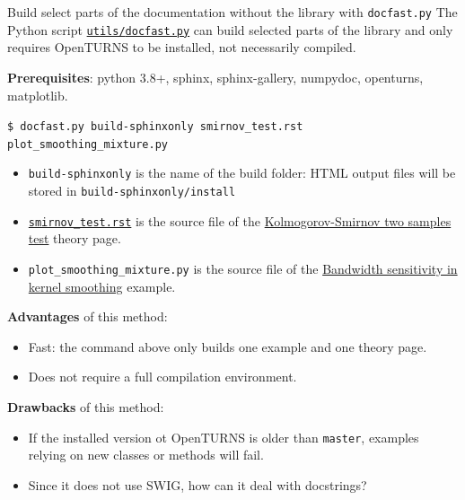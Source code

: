 \documentclass[8pt, handout]{beamer}
\begin{document}
\begin{frame}{Build select parts of the documentation without the library with \texttt{docfast.py}}
The Python script \href{https://github.com/openturns/openturns/blob/master/utils/docfast.py}{\texttt{utils/\alert{docfast.py}}} can build selected parts of the library and only requires OpenTURNS to be installed, not necessarily compiled.

\textbf{Prerequisites}: python 3.8+, sphinx, sphinx-gallery, numpydoc, openturns, matplotlib.

\texttt{\$ docfast.py build-sphinxonly smirnov\_test.rst plot\_smoothing\_mixture.py}

\begin{itemize}
    \item \texttt{build-sphinxonly} is the name of the \alert{build folder}: HTML output files will be stored in \texttt{build-sphinxonly/install}
    \item \href{https://github.com/openturns/openturns/blob/master/python/doc/theory/data_analysis/smirnov_test.rst}{\texttt{smirnov\_test.rst}} is the source file of the \href{https://openturns.github.io/openturns/master/theory/data_analysis/smirnov_test.html}{\alert{Kolmogorov-Smirnov two samples test}} theory page.
    \item \texttt{plot\_smoothing\_mixture.py} is the source file of the
    \href{https://github.com/openturns/openturns/blob/master/python/doc/examples/data_analysis/distribution_fitting/plot_smoothing_mixture.py}{\alert{Bandwidth sensitivity in kernel smoothing}} example.
\end{itemize}

\textbf{Advantages} of this method:
\begin{itemize}
    \item \alert{Fast}: the command above only builds one example and one theory page.
    \item Does \alert{not} require a \alert{full compilation} environment.
\end{itemize}

\textbf{Drawbacks} of this method:
\begin{itemize}
    \item If the installed version ot OpenTURNS is older than \texttt{master}, examples relying on \alert{new classes or methods will fail}.
    \item Since it does not use SWIG, \alert{how can it deal with docstrings?}
\end{itemize}

\end{frame}
\end{document}

